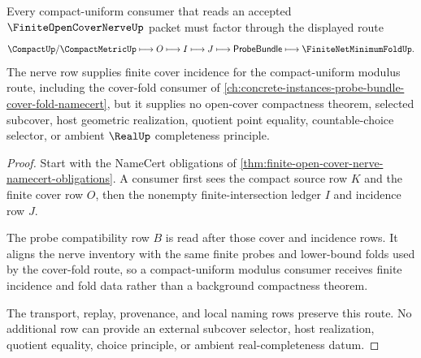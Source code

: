 \begin{theorem}
\label{thm:finite-open-cover-nerve-compact-uniform-route}
Every compact-uniform consumer that reads an accepted $\FiniteOpenCoverNerveUp$ packet must factor through the displayed route
$$
\CompactUp/\CompactMetricUp \longmapsto O \longmapsto I \longmapsto J \longmapsto \mathsf{ProbeBundle} \longmapsto \FiniteNetMinimumFoldUp .
$$
The nerve row supplies finite cover incidence for the compact-uniform modulus route, including the cover-fold consumer of \autoref{ch:concrete-instances-probe-bundle-cover-fold-namecert}, but it supplies no open-cover compactness theorem, selected subcover, host geometric realization, quotient point equality, countable-choice selector, or ambient $\RealUp$ completeness principle.
\end{theorem}
\begin{proof}
Start with the NameCert obligations of \autoref{thm:finite-open-cover-nerve-namecert-obligations}. A consumer first sees the compact source row $K$ and the finite cover row $O$, then the nonempty finite-intersection ledger $I$ and incidence row $J$.

The probe compatibility row $B$ is read after those cover and incidence rows. It aligns the nerve inventory with the same finite probes and lower-bound folds used by the cover-fold route, so a compact-uniform modulus consumer receives finite incidence and fold data rather than a background compactness theorem.

The transport, replay, provenance, and local naming rows preserve this route. No additional row can provide an external subcover selector, host realization, quotient equality, choice principle, or ambient real-completeness datum.
\end{proof}


\begin{closurestatus}{\FiniteOpenCoverNerveUp}
  \theoryclosure{\seedClosure}
  \formalstatus{\unformalizedV}
\end{closurestatus}
